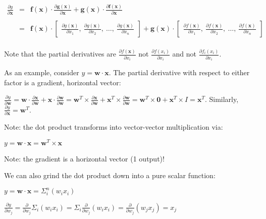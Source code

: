 \documentclass[11pt]{article}
\begin{document}
$
\begin{array}{rcl}
\frac{\partial y}{\partial \mathbf{x}} & = & \mathbf{f(x)} \cdot \frac{\partial \mathbf{g(x)}}{\partial \mathbf{x}} + \mathbf{g(x)} \cdot \frac{\partial \mathbf{f(x)}}{\partial \mathbf{x}}\\\\
 & = & \mathbf{f(x)} \cdot \begin{bmatrix} \frac{\partial g(\mathbf{x})}{\partial x_1},~ \frac{\partial g(\mathbf{x})}{\partial x_2},~ \ldots,~ \frac{\partial g(\mathbf{x})}{\partial x_n} \end{bmatrix}  + \mathbf{g(x)} \cdot \begin{bmatrix} \frac{\partial f(\mathbf{x})}{\partial x_1},~ \frac{\partial f(\mathbf{x})}{\partial x_2},~ \ldots,~ \frac{\partial f(\mathbf{x})}{\partial x_n} \end{bmatrix}\\

\end{array}
$

Note that the partial derivatives are $\frac{\partial f(\mathbf{x})}{\partial x_i}$ not $\frac{\partial f(x_i)}{\partial x_i}$ and not $\frac{\partial f_i(x_i)}{\partial x_i}$.

As an example, consider $y = \mathbf{w} \cdot \mathbf{x}$. The partial derivative with respect to either factor is a gradient, horizontal vector:

$\frac{\partial y}{\partial \mathbf{w}} = \mathbf{w} \cdot \frac{\partial \mathbf{x}}{\partial \mathbf{w}} + \mathbf{x} \cdot \frac{\partial \mathbf{w}}{\partial \mathbf{w}} = \mathbf{w}^T \times \frac{\partial \mathbf{x}}{\partial \mathbf{w}} + \mathbf{x}^T \times \frac{\partial \mathbf{w}}{\partial \mathbf{w}} = \mathbf{w}^T \times \mathbf{0} + \mathbf{x}^T \times I = \mathbf{x}^T$. Similarly, $\frac{\partial y}{\partial \mathbf{x}} = \mathbf{w}^T$.

Note: the dot product transforms into vector-vector multiplication via:

$y = \mathbf{w} \cdot \mathbf{x} = \mathbf{w}^{T} \times \mathbf{x}$

Note: the gradient is a horizontal vector (1 output)!

We can also grind the dot product down into a pure scalar function:

$y = \mathbf{w} \cdot \mathbf{x} = \Sigma_i^n (w_i x_i)$

$\frac{\partial y}{\partial w_j} = \frac{\partial}{\partial w_j} \Sigma_i (w_i x_i) = \Sigma_i \frac{\partial}{\partial w_j} (w_i x_i) = \frac{\partial}{\partial w_j} (w_j x_j) = x_j$
\end{document}
